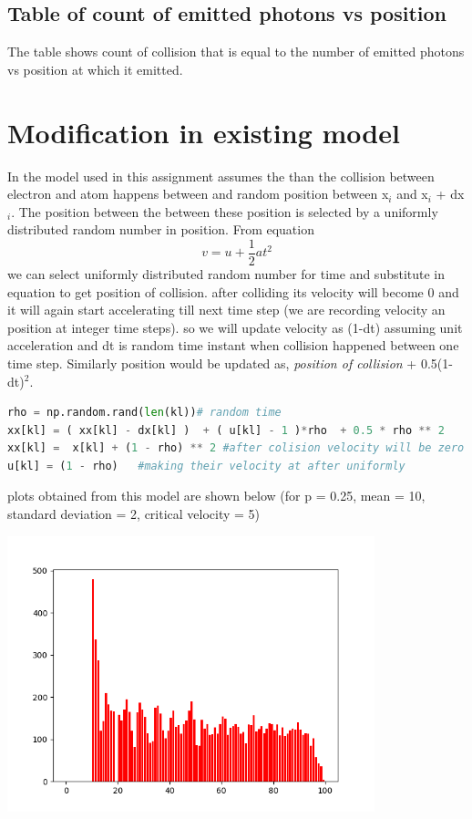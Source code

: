 \documentclass[a4paper]{article}
\begin{document}
\subsection{Table of count of emitted photons vs position }
The table shows count of collision that is equal to the number of emitted photons vs position at which it emitted.

\section{Modification in existing model}
In the model used in this assignment assumes the than the collision between electron and atom happens between and random position between x$_{i}$ and x$_{i}$ + dx$_{i}$. The position between the between these position is selected by a uniformly distributed random number in position. From equation $$ v = u + \frac{1}{2}at^{2} $$
we can select uniformly distributed random number for time and substitute in equation to get position of collision. 
after colliding its velocity will become 0 and  it will again start accelerating till next time step (we are recording velocity an position at integer time steps). so we will update velocity as (1-dt) assuming unit acceleration and dt is random time instant when collision happened between one time step. Similarly position would be updated as, \textit{position of collision} + 0.5(1-dt)$^{2}$. 
\begin{lstlisting}[language=Python]
rho = np.random.rand(len(kl))# random time	
xx[kl] = ( xx[kl] - dx[kl] )  + ( u[kl] - 1 )*rho  + 0.5 * rho ** 2  	#finding exact position of collision between xi-1 and xi
xx[kl] =  x[kl] + (1 - rho) ** 2 #after colision velocity will be zero and it will aagain accelerate.
u[kl] = (1 - rho)	#making their velocity at after uniformly
\end{lstlisting}
plots obtained from this model are shown below
(for p = 0.25, mean = 10, standard deviation = 2, critical velocity = 5)
\begin{center}
\includegraphics[width=0.8\textwidth]{Figure_1_v5.png}
\end{center}
\end{document}
